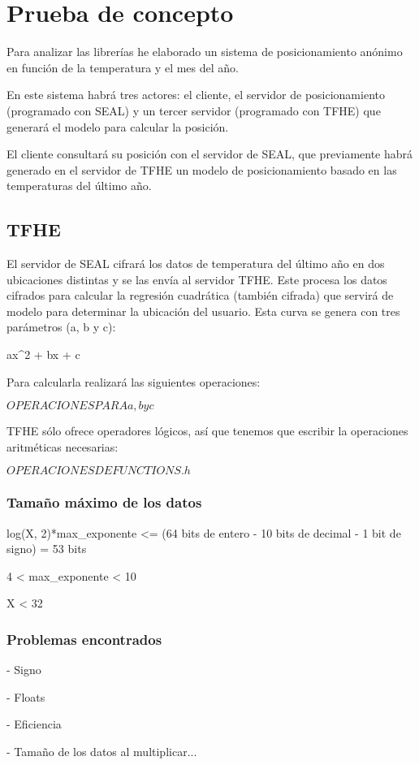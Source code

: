 \chapter{Prueba de concepto}

Para analizar las librerías he elaborado un sistema de posicionamiento anónimo en función de la temperatura y el mes del año. 

En este sistema habrá tres actores: el cliente, el servidor de posicionamiento (programado con SEAL) y un tercer servidor (programado con TFHE) que generará el modelo para calcular la posición.

El cliente consultará su posición con el servidor de SEAL, que previamente habrá generado en el servidor de TFHE un modelo de posicionamiento basado en las temperaturas del último año.

\section{TFHE}

El servidor de SEAL cifrará los datos de temperatura del último año en dos ubicaciones distintas y se las envía al servidor TFHE. Este procesa los datos cifrados para calcular la regresión cuadrática (también cifrada) que servirá de modelo para determinar la ubicación del usuario. Esta curva se genera con tres parámetros (a, b y c):

ax^2 + bx + c

Para calcularla realizará las siguientes operaciones:

$ OPERACIONES PARA a, b y c $

TFHE sólo ofrece operadores lógicos, así que tenemos que escribir la operaciones aritméticas necesarias:

$ OPERACIONES DE FUNCTIONS.h $

\subsection{Tamaño máximo de los datos}

log(X, 2)*max_exponente <= (64 bits de entero - 10 bits de decimal - 1 bit de signo) = 53 bits

4 < max_exponente < 10

X < 32

\subsection{Problemas encontrados}

- Signo

- Floats

- Eficiencia

- Tamaño de los datos al multiplicar...


